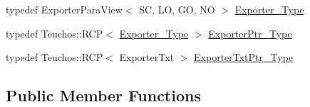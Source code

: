 \begin{DoxyCompactItemize}
\item 
typedef Exporter\+Para\+View$<$ SC, LO, GO, NO $>$ \hyperlink{classFEDD_1_1AdaptiveMeshRefinement_a67eda4a3b688720eec1f8d4a6dcb7577}{Exporter\+\_\+\+Type}
\item 
typedef Teuchos\+::\+R\+CP$<$ \hyperlink{classFEDD_1_1AdaptiveMeshRefinement_a67eda4a3b688720eec1f8d4a6dcb7577}{Exporter\+\_\+\+Type} $>$ \hyperlink{classFEDD_1_1AdaptiveMeshRefinement_ac8cda8533e68f9049ede0208be2175d6}{Exporter\+Ptr\+\_\+\+Type}
\item 
typedef Teuchos\+::\+R\+CP$<$ Exporter\+Txt $>$ \hyperlink{classFEDD_1_1AdaptiveMeshRefinement_afc81b6919eb7756e16e696631e0d666b}{Exporter\+Txt\+Ptr\+\_\+\+Type}
\end{DoxyCompactItemize}
\subsection*{Public Member Functions}
